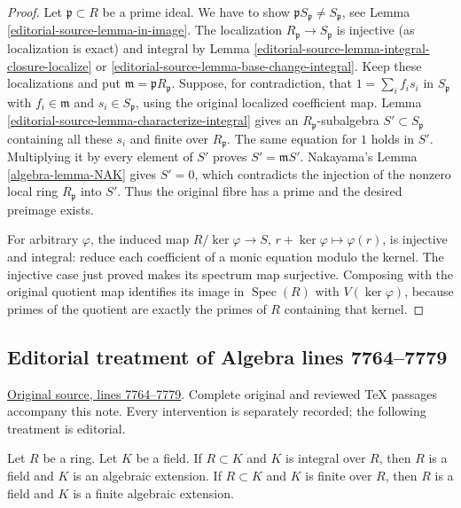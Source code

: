 \begin{proof}
Let $\mathfrak p \subset R$ be a prime ideal.
We have to show $\mathfrak pS_{\mathfrak p} \not = S_{\mathfrak p}$, see
Lemma \ref{editorial-source-lemma-in-image}.
The localization $R_{\mathfrak p} \to S_{\mathfrak p}$ is injective
(as localization is exact) and integral by
Lemma \ref{editorial-source-lemma-integral-closure-localize} or
\ref{editorial-source-lemma-base-change-integral}.
Keep these localizations and put $\mathfrak m=\mathfrak pR_{\mathfrak p}$.
Suppose, for contradiction, that
$1=\sum_i f_is_i$ in $S_{\mathfrak p}$ with
$f_i\in\mathfrak m$ and $s_i\in S_{\mathfrak p}$, using the
original localized coefficient map. Lemma
\ref{editorial-source-lemma-characterize-integral} gives an
$R_{\mathfrak p}$-subalgebra $S'\subset S_{\mathfrak p}$
containing all these $s_i$ and finite over $R_{\mathfrak p}$.
The same equation for $1$ holds in $S'$. Multiplying it by every
element of $S'$ proves $S'=\mathfrak mS'$. Nakayama's
Lemma \ref{algebra-lemma-NAK} gives $S'=0$, which contradicts the injection
of the nonzero local ring $R_{\mathfrak p}$ into $S'$.
Thus the original fibre has a prime and the desired preimage exists.

For arbitrary $\varphi$, the induced map
$R/\ker\varphi\to S$, $r+\ker\varphi\mapsto\varphi(r)$,
is injective and integral: reduce each coefficient of a monic
equation modulo the kernel. The injective case just proved makes
its spectrum map surjective. Composing with the original quotient
map identifies its image in $\operatorname{Spec}(R)$ with
$V(\ker\varphi)$, because primes of the quotient are exactly
the primes of $R$ containing that kernel.
\end{proof}


\subsection{Editorial treatment of Algebra lines 7764--7779}

\hypertarget{algebra-context-082}{}

\noindent\href{https://github.com/stacks/stacks-project/blob/a04446e57ec1fbc252a871afcec7752fb2807b14/algebra.tex\#L7764}{Original source, lines 7764--7779}. Complete original and reviewed TeX passages accompany this note. Every intervention is separately recorded; the following treatment is editorial.


\begin{lemma}
\label{editorial-source-lemma-integral-under-field}
Let $R$ be a ring. Let $K$ be a field.
If $R \subset K$ and $K$ is integral over $R$,
then $R$ is a field and $K$ is an algebraic extension.
If $R \subset K$ and $K$ is finite over $R$,
then $R$ is a field and $K$ is a finite algebraic extension.
\end{lemma}

